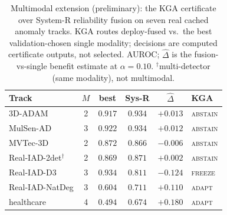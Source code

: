 \documentclass[conference]{IEEEtran}
\theoremstyle{plain}
\theoremstyle{definition}
\begin{document}
\FloatBarrier
\begin{table}[t]\centering\footnotesize
\caption{Multimodal extension (preliminary): the \textsc{KGA} certificate over System-R reliability fusion
on seven real cached anomaly tracks. \textsc{KGA} routes deploy-fused vs.\ the best validation-chosen
single modality; decisions are computed certificate outputs, not selected. AUROC; $\hat\Delta$ is the
fusion-vs-single benefit estimate at $\alpha{=}0.10$. $^\dagger$multi-detector (same modality), not multimodal.}
\label{tab:multimodal}
\begin{tabular}{@{}lccccl@{}}
\toprule
Track & $M$ & best & Sys-R & $\hat\Delta$ & \textsc{KGA} \\
\midrule
3D-ADAM                 & 2 & $0.917$ & $0.934$ & $+0.013$ & \textsc{abstain} \\
MulSen-AD               & 3 & $0.922$ & $0.934$ & $+0.012$ & \textsc{abstain} \\
MVTec-3D                & 2 & $0.872$ & $0.866$ & $-0.006$ & \textsc{abstain} \\
Real-IAD-2det$^\dagger$ & 2 & $0.869$ & $0.871$ & $+0.002$ & \textsc{abstain} \\
Real-IAD-D3             & 3 & $0.934$ & $0.811$ & $-0.124$ & \textsc{freeze} \\
Real-IAD-NatDeg         & 3 & $0.604$ & $0.711$ & $+0.110$ & \textsc{adapt} \\
healthcare              & 4 & $0.494$ & $0.674$ & $+0.180$ & \textsc{adapt} \\
\bottomrule
\end{tabular}
\end{table}
\end{document}
